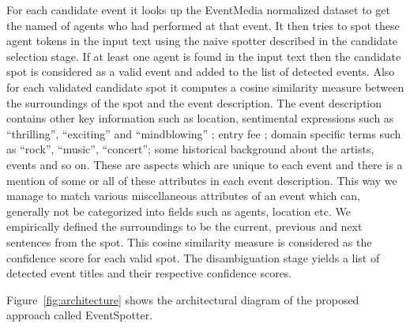 \documentclass[10pt,a4paper]{article}
\begin{document}
For each candidate event it looks up the EventMedia normalized dataset to get the named of agents who had performed at that event. It then tries to spot these  agent tokens in the input text using the naive spotter described in the candidate selection stage. If at least one agent is found in the input text then the candidate spot is considered as a valid event and added to the list of detected events. Also for each validated candidate spot it computes a cosine similarity measure between the surroundings of the spot and the event description. The event description contains other key information such as location, sentimental expressions such as ``thrilling'', ``exciting'' and ``mindblowing'' ; entry fee ; domain specific terms such as ``rock'', ``music'', ``concert''; some historical background about the artists, events and so on. These are aspects which are unique to each event and there is a mention of some or all of these attributes in each event description. This way we manage to match various miscellaneous attributes of an event which can, generally not be categorized into fields such as agents, location etc. We empirically defined the surroundings to be the current, previous and next sentences from the spot. This cosine similarity measure is considered as the confidence score for each valid spot. The disambiguation stage yields a list of detected event titles and their respective confidence scores.

{\color{red}{A+M: redo the figure, remove upcoming logo and add Eventbrite, Facebook logos}}
Figure~\ref{fig:architecture} shows the architectural diagram of the proposed approach called EventSpotter. 
\end{document}

